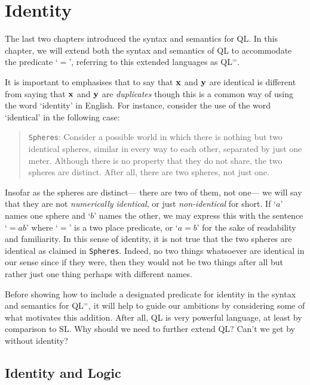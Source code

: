 ﻿%
\chapter{Identity}
\label{ch.identity}

The last two chapters introduced the syntax and semantics for QL.
In this chapter, we will extend both the syntax and semantics of QL to accommodate the  predicate `$=$', referring to this extended languages as QL$^=$.

It is important to emphasises that to say that $\mathbf{x}$ and $\mathbf{y}$ are identical is different from saying that $\mathbf{x}$ and $\mathbf{y}$ are \textit{duplicates} though this is a common way of using the word `identity' in English.
For instance, consider the use of the word `identical' in the following case:

  \begin{quote}
    \texttt{Spheres}: Consider a possible world in which there is nothing but two identical spheres, similar in every way to each other, separated by just one meter.
    Although there is no property that they do not share, the two spheres are distinct.
    After all, there are two spheres, not just one.
  \end{quote}

Insofar as the spheres are distinct--- there are two of them, not one--- we will say that they are not \textit{numerically identical}, or just \textit{non-identical} for short.
If `$a$' names one sphere and `$b$' names the other, we may express this with the sentence `${=}ab$' where `$=$' is a two place predicate, or `$a=b$' for the sake of readability and familiarity.
In this sense of identity, it is not true that the two spheres are identical as claimed in \texttt{Spheres}.
Indeed, no two things whatsoever are identical in our sense since if they were, then they would not be two things after all but rather just one thing perhaps with different names.

Before showing how to include a designated predicate for identity in the syntax and semantics for QL$^=$, it will help to guide our ambitions by considering some of what motivates this addition.
After all, QL is very powerful language, at least by comparison to SL.
Why should we need to further extend QL?
Can't we get by without identity?



\section{Identity and Logic}%
  \label{sec:IdentityLogic}


